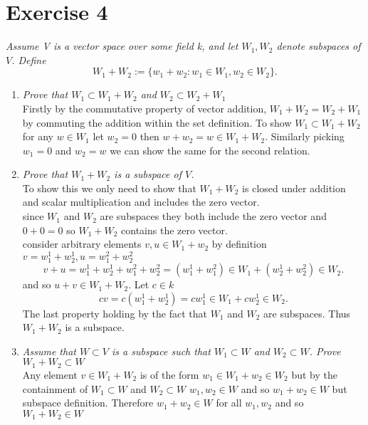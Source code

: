 \documentclass{article}
\begin{document}
    \section{Exercise 4}
    \emph{Assume V is a vector space over some field k, and let $W_1, W_2$ denote subspaces of $V$. Define
        \[
            W_1 + W_2 := \{ w_1 + w_2: w_1 \in W_1, w_2 \in W_2\}
        .\] 
    }
    \begin{enumerate}
        \item \emph{Prove that $W_1 \subset W_1 + W_2$ and $W_2 \subset W_2 + W_1$ }\\
            Firstly by the commutative property of vector addition, $W_1 + W_2 = W_2 + W_1$ by commuting the addition within the set definition.
            To show $W_1 \subset W_1 + W_2$ for any $w \in W_1$ let $w_2 = 0$ then $w+ w_2 = w \in W_1 + W_2$. Similarly picking $w_1 = 0$ and $w_2 = w$ we can show the same for the second relation.
        \item \emph{Prove that $W_1+W_2$ is a subspace of $V$.}\\
            To show this we only need to show that $W_1 + W_2$ is closed under addition and scalar multiplication and includes the zero vector.\\
            since $W_1$ and $W_2$ are subspaces they both include the zero vector and $0+0 = 0$ so $W_1+W_2$ contains the zero vector.\\
            consider arbitrary elements  $v,u \in W_1+w_2$ by definition $v = w_1^{1} + w_2^{1}, u = w_1^{2} + w_2^2$ 
            \[
            v+u = w_1^{1} + w_2^1 + w_1^2+w_2^2 = (w_1^{1}+w_1^2)\in W_1+(w_2^{1}+w_2^2) \in W_2
            .\] 
            and so $u+v \in W_1+W_2$. Let $c \in k$
            \[
                cv = c(w_1^{1}+w_2^{1} ) = cw_1^{1} \in W_1 + cw_2^{1}\in W_2 
            .\] 
            The last property holding by the fact that $W_1$ and $W_2$ are subspaces. Thus $W_1 + W_2$ is a subspace.
        \item \emph{Assume that $W \subset V$ is a subspace such that $W_1 \subset W$ and $W_2 \subset W$. Prove $W_1 + W_2 \subset W$ }\\
            Any element $v \in W_1 + W_2$ is of the form $w_1 \in W_1 + w_2 \in W_2$ but by the containment of $W_1 \subset W$ and $W_2 \subset W$  $w_1, w_2 \in W$ and so $w_1 + w_2 \in W$ but subspace definition.
            Therefore $w_1 + w_2 \in W$ for all $w_1, w_2$ and so $W_1 + W_2 \in W$
    \end{enumerate}
\end{document}
